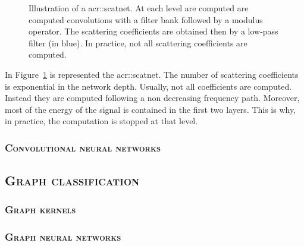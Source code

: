             \begin{figure}
                \centering
                
                \caption{
                    \label{fig::scatnet} Illustration of a \gls{acr::scatnet}.
                    At each level are computed are computed convolutions with a filter bank followed by a modulus operator.
                    The scattering coefficients are obtained then by a low-pass filter (in blue).
                    In practice, not all scattering coefficients are computed.
                }
            \end{figure}

            In Figure~\ref{fig::scatnet} is represented the \acrlong{acr::scatnet}.
            The number of scattering coefficients is exponential in the network depth.
            Usually, not all coefficients are computed.
            Instead they are computed following a non decreasing frequency path.
            Moreover, most of the energy of the signal is contained in the first two layers.
            This is why, in practice, the computation is stopped at that level.

        \subsubsection{\textsc{Convolutional neural networks}}
    \subsection{\textsc{Graph classification}}
        \label{subsec::state_of_the_art::mlpr::graph_classification}

        \subsubsection{\textsc{Graph kernels}}
        \subsubsection{\textsc{Graph neural networks}}
